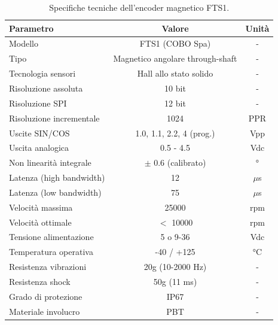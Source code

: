 \begin{table}[htbp]
    \centering
    \caption{Specifiche tecniche dell'encoder magnetico FTS1.}
    \label{tab:encoder_specs}
    \begin{tabular}{|l|c|c|}
        \hline
        \textbf{Parametro}       & \textbf{Valore}                  & \textbf{Unità} \\
        \hline
        Modello                  & FTS1 (COBO Spa)                  & -              \\
        Tipo                     & Magnetico angolare through-shaft & -              \\
        Tecnologia sensori       & Hall allo stato solido           & -              \\
        Risoluzione assoluta     & 10 bit                           & -              \\
        Risoluzione SPI          & 12 bit                           & -              \\
        Risoluzione incrementale & 1024                             & PPR            \\
        Uscite SIN/COS           & 1.0, 1.1, 2.2, 4 (prog.)         & Vpp            \\
        Uscita analogica         & 0.5 - 4.5                        & Vdc            \\
        Non linearità integrale  & $\pm$ 0.6 (calibrato)            & °              \\
        Latenza (high bandwidth) & 12                               & $\mu$s         \\
        Latenza (low bandwidth)  & 75                               & $\mu$s         \\
        Velocità massima         & 25000                            & rpm            \\
        Velocità ottimale        & $<$ 10000                        & rpm            \\
        Tensione alimentazione   & 5 o 9-36                         & Vdc            \\
        Temperatura operativa    & -40 / +125                       & °C             \\
        Resistenza vibrazioni    & 20g (10-2000 Hz)                 & -              \\
        Resistenza shock         & 50g (11 ms)                      & -              \\
        Grado di protezione      & IP67                             & -              \\
        Materiale involucro      & PBT                              & -              \\
        \hline
    \end{tabular}
\end{table}

